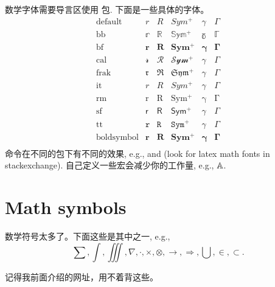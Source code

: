 数学字体需要导言区使用 包. 下面是一些具体的字体。
\[
	\begin{array}{lccccc}
	\text{default} & r & R & Sym^+ & \gamma & \Gamma \\
	\text{bb} & \mathbb{r} & \mathbb{R} & \mathbb{Sym^+} & \mathbb{\gamma}& \mathbb{\Gamma} \\ 
	\text{bf} & \mathbf{r} & \mathbf{R} & \mathbf{Sym^+} & \mathbf{\gamma}& \mathbf{\Gamma} \\
	\text{cal} & \mathcal{r} & \mathcal{R} & \mathcal{Sym^+} & \mathcal{\gamma}& \mathcal{\Gamma} \\
	\text{frak} & \mathfrak{r} & \mathfrak{R} & \mathfrak{Sym^+} & \mathfrak{\gamma}& \mathfrak{\Gamma} \\
	\text{it} & \mathit{r} & \mathit{R} & \mathit{Sym^+} & \mathit{\gamma}& \mathit{\Gamma} \\
	\text{rm} & \mathrm{r} & \mathrm{R} & \mathrm{Sym^+} & \mathrm{\gamma}& \mathrm{\Gamma} \\
	\text{sf} & \mathsf{r} & \mathsf{R} & \mathsf{Sym^+} & \mathsf{\gamma}& \mathsf{\Gamma} \\
	\text{tt} & \mathtt{r} & \mathtt{R} & \mathtt{Sym^+} & \mathtt{\gamma}& \mathtt{\Gamma} \\
	\text{boldsymbol} & \boldsymbol{r} & \boldsymbol{R} & \boldsymbol{Sym^+} & \boldsymbol{\gamma}& \boldsymbol{\Gamma} \\
	\end{array}
\]
命令在不同的包下有不同的效果, e.g.,  and  (look for latex math fonts in stackexchange). 
自己定义一些宏会减少你的工作量, e.g., $\mathbb{A}$.


\section{Math symbols}
\label{math_msymb}

数学符号太多了。下面这些是其中之一, e.g., 
\begin{equation}
	\sum , \int , \iiint , \nabla , \cdot , \times , \otimes , \rightarrow , \Rightarrow , \bigcup , \in , \subset .
\end{equation}

记得我前面介绍的网址，用不着背这些。



